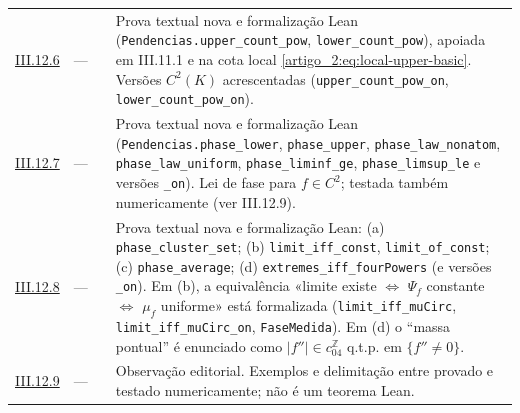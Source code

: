 \begin{longtable}{@{}p{.11\linewidth}p{.09\linewidth}p{.09\linewidth}p{.59\linewidth}@{}}
\hyperref[map:artigo_2:12.6]{III.12.6} & --- & \pageref{map:artigo_2:12.6} & Prova textual nova e formalização Lean (\texttt{Pendencias.upper\_count\_pow}, \texttt{lower\_count\_pow}), apoiada em III.11.1 e na cota local \eqref{artigo_2:eq:local-upper-basic}. Versões $C^2(K)$ acrescentadas (\texttt{upper\_count\_pow\_on}, \texttt{lower\_count\_pow\_on}).\\[4pt]
\hyperref[map:artigo_2:12.7]{III.12.7} & --- & \pageref{map:artigo_2:12.7} & Prova textual nova e formalização Lean (\texttt{Pendencias.phase\_lower}, \texttt{phase\_upper}, \texttt{phase\_law\_nonatom}, \texttt{phase\_law\_uniform}, \texttt{phase\_liminf\_ge}, \texttt{phase\_limsup\_le} e versões \texttt{\_on}). Lei de fase para $f\in C^2$; testada também numericamente (ver III.12.9).\\[4pt]
\hyperref[map:artigo_2:12.8]{III.12.8} & --- & \pageref{map:artigo_2:12.8} & Prova textual nova e formalização Lean: (a) \texttt{phase\_cluster\_set}; (b) \texttt{limit\_iff\_const}, \texttt{limit\_of\_const}; (c) \texttt{phase\_average}; (d) \texttt{extremes\_iff\_fourPowers} (e versões \texttt{\_on}). Em (b), a equivalência «limite existe $\Leftrightarrow$ $\Psi_f$ constante $\Leftrightarrow$ $\mu_f$ uniforme» está formalizada (\texttt{limit\_iff\_muCirc}, \texttt{limit\_iff\_muCirc\_on}, \texttt{FaseMedida}). Em (d) o ``massa pontual'' é enunciado como $|f''|\in c_04^{\mathbb Z}$ q.t.p. em $\{f''\ne0\}$.\\[4pt]
\hyperref[map:artigo_2:12.9]{III.12.9} & --- & \pageref{map:artigo_2:12.9} & Observação editorial. Exemplos e delimitação entre provado e testado numericamente; não é um teorema Lean.\\[4pt]
\bottomrule\end{longtable}\normalsize

